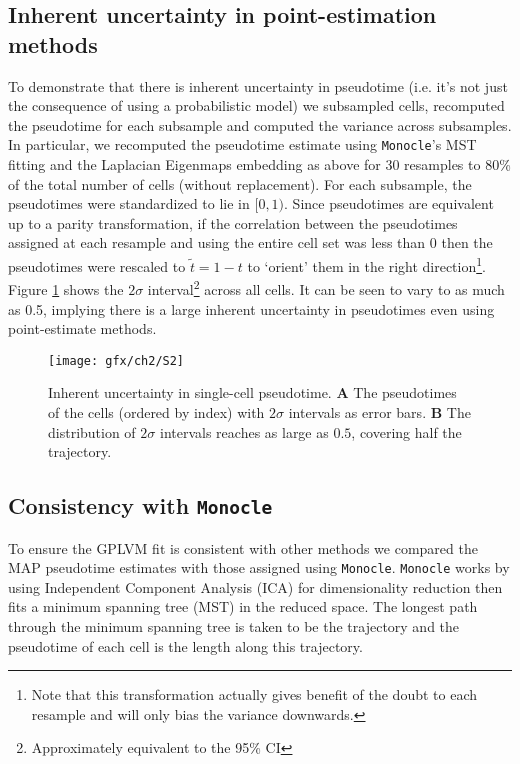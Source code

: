 \subsection{Inherent uncertainty in point-estimation methods} \label{sec:inherentuncert}

To demonstrate that there is inherent uncertainty in pseudotime (i.e. it's not just the consequence of using a probabilistic model) we subsampled cells, recomputed the pseudotime for each subsample and computed the variance across subsamples. In particular, we recomputed the pseudotime estimate using \texttt{Monocle}'s MST fitting and the Laplacian Eigenmaps embedding as above for 30 resamples to 80\% of the total number of cells (without replacement). For each subsample, the pseudotimes were standardized to lie in $[0,1)$. Since pseudotimes are equivalent up to a parity transformation, if the correlation between the pseudotimes assigned at each resample and using the entire cell set was less than 0 then the pseudotimes were rescaled to $\tilde{t} = 1-t$ to `orient' them in the right direction\footnote{Note that this transformation actually gives benefit of the doubt to each resample and will only bias the variance downwards.}. Figure \ref{fig:s2} shows the $2\sigma$ interval\footnote{Approximately equivalent to the 95\% CI} across all cells. It can be seen to vary to as much as 0.5, implying there is a large inherent uncertainty in pseudotimes even using point-estimate methods.

\begin{figure}
\centering
	\texttt{[image: gfx/ch2/S2]}
\caption[Inherent uncertainty in single-cell pseudotime.]{Inherent uncertainty in single-cell pseudotime. \textbf{A} The pseudotimes of the cells (ordered by index) with $2 \sigma$ intervals as error bars. \textbf{B} The distribution of $2\sigma$ intervals reaches as large as $0.5$, covering half the trajectory.} \label{fig:s2}
\end{figure}

\subsection{Consistency with \texttt{Monocle}}
To ensure the GPLVM fit is consistent with other methods we compared the MAP pseudotime estimates with those assigned using \texttt{Monocle}. \texttt{Monocle} works by using Independent Component Analysis (ICA) for dimensionality reduction then fits a minimum spanning tree (MST) in the reduced space. The longest path through the minimum spanning tree is taken to be the trajectory and the pseudotime of each cell is the length along this trajectory.

